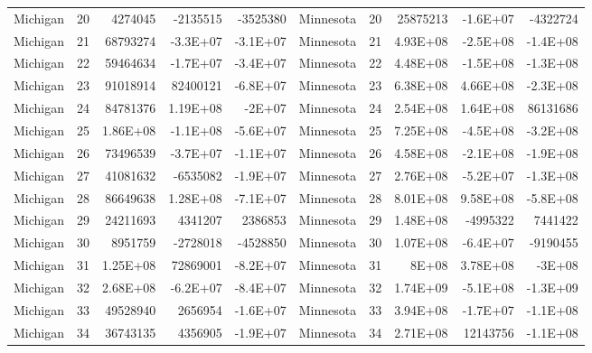 \begin{landscape}
\begin{singlespace}
\begin{longtable}{lrrrr|lrrrr}
		Michigan &  20 & 4274045 & -2135515 & -3525380 & Minnesota &  20 & 25875213 & -1.6E+07 & -4322724 \\
		Michigan &  21 & 68793274 & -3.3E+07 & -3.1E+07 & Minnesota &  21 & 4.93E+08 & -2.5E+08 & -1.4E+08 \\
		Michigan &  22 & 59464634 & -1.7E+07 & -3.4E+07 & Minnesota &  22 & 4.48E+08 & -1.5E+08 & -1.3E+08 \\
		Michigan &  23 & 91018914 & 82400121 & -6.8E+07 & Minnesota &  23 & 6.38E+08 & 4.66E+08 & -2.3E+08 \\
		Michigan &  24 & 84781376 & 1.19E+08 & -2E+07 & Minnesota &  24 & 2.54E+08 & 1.64E+08 & 86131686 \\
		Michigan &  25 & 1.86E+08 & -1.1E+08 & -5.6E+07 & Minnesota &  25 & 7.25E+08 & -4.5E+08 & -3.2E+08 \\
		Michigan &  26 & 73496539 & -3.7E+07 & -1.1E+07 & Minnesota &  26 & 4.58E+08 & -2.1E+08 & -1.9E+08 \\
		Michigan &  27 & 41081632 & -6535082 & -1.9E+07 & Minnesota &  27 & 2.76E+08 & -5.2E+07 & -1.3E+08 \\
		Michigan &  28 & 86649638 & 1.28E+08 & -7.1E+07 & Minnesota &  28 & 8.01E+08 & 9.58E+08 & -5.8E+08 \\
		Michigan &  29 & 24211693 & 4341207 & 2386853 & Minnesota &  29 & 1.48E+08 & -4995322 & 7441422 \\
		Michigan &  30 & 8951759 & -2728018 & -4528850 & Minnesota &  30 & 1.07E+08 & -6.4E+07 & -9190455 \\
		Michigan &  31 & 1.25E+08 & 72869001 & -8.2E+07 & Minnesota &  31 & 8E+08 & 3.78E+08 & -3E+08 \\
		Michigan &  32 & 2.68E+08 & -6.2E+07 & -8.4E+07 & Minnesota &  32 & 1.74E+09 & -5.1E+08 & -1.3E+09 \\
		Michigan &  33 & 49528940 & 2656954 & -1.6E+07 & Minnesota &  33 & 3.94E+08 & -1.7E+07 & -1.1E+08 \\
		Michigan &  34 & 36743135 & 4356905 & -1.9E+07 & Minnesota &  34 & 2.71E+08 & 12143756 & -1.1E+08\\


\end{longtable}
\end{singlespace}
\end{landscape}
